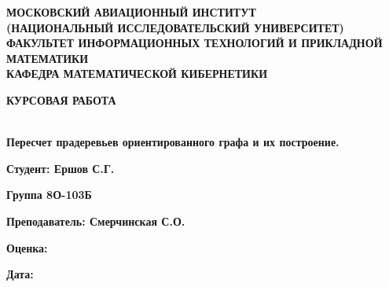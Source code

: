 \documentclass{article}
\author{Otetc pitona}
\begin{document}
\begin{center}
	\textbf{МОСКОВСКИЙ АВИАЦИОННЫЙ ИНСТИТУТ}
	\\
	\textbf{(НАЦИОНАЛЬНЫЙ ИССЛЕДОВАТЕЛЬСКИЙ УНИВЕРСИТЕТ)}
	\\ 
	\textbf{ФАКУЛЬТЕТ ИНФОРМАЦИОННЫХ ТЕХНОЛОГИЙ И ПРИКЛАДНОЙ МАТЕМАТИКИ}
	\\ 
	\textbf{КАФЕДРА МАТЕМАТИЧЕСКОЙ КИБЕРНЕТИКИ}
\end{center}
\vspace{100mm}
\begin{center}
	\begin{Large}\textbf{КУРСОВАЯ РАБОТА}\end{Large}
	\vspace{5mm}
	\\
	\textbf{Пересчет прадеревьев ориентированного графа и их построение.}
\end{center}
\vspace{70mm}
\begin{large}
	\par
	\hspace{105mm}\textbf{Студент: Ершов С.Г.}
	\vspace{3mm}
	\par
	\hspace{105mm}\textbf{Группа 8О-103Б}
	\vspace{3mm}
	\par
	\hspace{105mm}\textbf{Преподаватель: Смерчинская С.О.}
	\vspace{3mm}
	\par
	\hspace{105mm}\textbf{Оценка:}
	\vspace{3mm}
	\par
	\hspace{105mm}\textbf{Дата:}
\end{large}
\newpage
\end{document}
